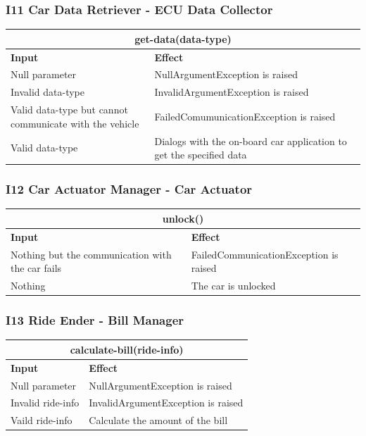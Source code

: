 \documentclass{article}
\begin{document}
\subsubsection{I11 Car Data Retriever - ECU Data Collector}
\begin{tabular}{ |p{5cm}|p{7cm}| }
  \hline
  \multicolumn{2}{|c|}{get-data(data-type)} \\
  \hline
  \textbf{Input} & \textbf{Effect} \\
  \hline
  Null parameter & NullArgumentException is raised\\
  \hline
  Invalid data-type & InvalidArgumentException is raised\\
  \hline
  Valid data-type but cannot communicate with the vehicle & FailedComumunicationException is raised\\
  \hline
   Valid data-type & Dialogs with the on-board car application to get the specified data\\
  \hline
\end{tabular}
\subsubsection{I12 Car Actuator Manager - Car Actuator}
\begin{tabular}{ |p{5cm}|p{7cm}| }
  \hline
  \multicolumn{2}{|c|}{unlock()} \\
  \hline
  \textbf{Input} & \textbf{Effect} \\
  \hline
  Nothing but the communication with the car fails & FailedCommunicationException is raised\\
  \hline
  Nothing & The car is unlocked \\
  \hline
\end{tabular}
\subsubsection{I13 Ride Ender - Bill Manager}
\begin{tabular}{ |p{5cm}|p{7cm}| }
  \hline
  \multicolumn{2}{|c|}{calculate-bill(ride-info)} \\
  \hline
  \textbf{Input} & \textbf{Effect} \\
  \hline
  Null parameter & NullArgumentException is raised\\
  \hline
  Invalid ride-info & InvalidArgumentException is raised \\
  \hline
  Vaild ride-info & Calculate the amount of the bill\\
  \hline
\end{tabular}
\end{document}
